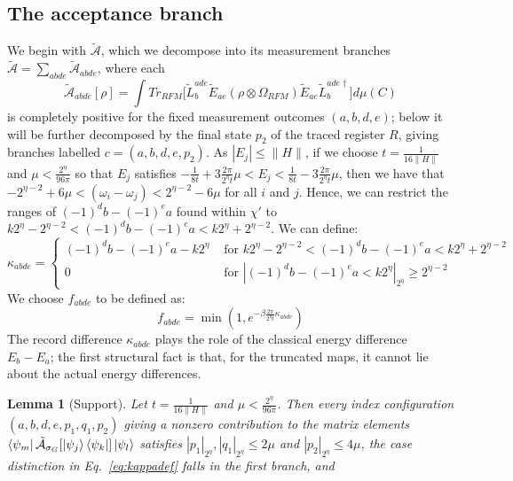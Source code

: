 \documentclass[aps,floatfix,10pt,amssymb,amsfont,amsmath,superscriptaddress,float,nofootinbib,longbibliography,nobalancelastpage,twocolumn]{revtex4-2}
\newtheorem{lemma}{Lemma}
\begin{document}
\subsection{The acceptance branch}
\label{subsec:acceptance}
\begin{widetext}
We begin with $\tilde{\mathcal{A}}$, which we decompose into its measurement branches $\tilde{\mathcal{A}} = \sum_{abde}\tilde{\mathcal{A}}_{abde}$, where each
\begin{equation}
    \tilde{\mathcal{A}}_{abde}[\rho] = \int  Tr_{RFM}\bigg[\tilde L_b^{ade} \tilde E_{ae} ( \rho\otimes \Omega_{RFM})
     \tilde E_{ae}\tilde L^{ade\dagger}_b\bigg]d\mu(C)
\end{equation}
is completely positive for the fixed measurement outcomes $(a,b,d,e)$; below it will be further decomposed by the final state $p_2$ of the traced register $R$, giving branches labelled $c = (a,b,d,e,p_2)$.
As $|E_j| \leq \|H\|$, if we choose $t = \frac{1}{16\|H\|}$ and $\mu < \frac{2^{\eta}}{96\pi}$ so that $E_j$ satisfies $-\frac{1}{8t} + 3\frac{2\pi}{2^{\eta}t}\mu < E_j < \frac{1}{8t} - 3\frac{2\pi}{2^{\eta}t}\mu$, then we have that $-2^{\eta-2}+6\mu < (\omega_{i}-\omega_{j}) < 2^{\eta-2}-6\mu$ for all $i$ and $j$. Hence, we can restrict the ranges of $(-1)^db-(-1)^ea$ found within $\chi'$ to $k2^{\eta} - 2^{\eta-2}< (-1)^db-(-1)^ea < k2^{\eta} + 2^{\eta-2}$.
We can define:
\begin{equation}\label{eq:kappadef}
    \kappa_{abde} = \begin{cases}(-1)^db-(-1)^ea-k2^{\eta}& \text{ for } k2^{\eta} - 2^{\eta-2}< (-1)^db-(-1)^ea < k2^{\eta} + 2^{\eta-2}\\
    0 & \text{ for } |(-1)^db-(-1)^ea < k2^{\eta}|_{2^{\eta}} \geq 2^{\eta-2}
    \end{cases}
\end{equation}
We choose $f_{abde}$ to be defined as:
\begin{equation}\label{eq:fdef}
    f_{abde} = \min(1,e^{-\beta\frac{2\pi}{2^{\eta}t}\kappa_{abde}})
\end{equation}
The record difference $\kappa_{abde}$ plays the role of the classical energy difference $E_b - E_a$; the first structural fact is that, for the truncated maps, it cannot lie about the actual energy differences.
\begin{lemma}[Support]
\label{lemma:support}
Let $t = \frac{1}{16\|H\|}$ and $\mu < \frac{2^{\eta}}{96\pi}$. Then every index configuration $(a,b,d,e,p_1,q_1,p_2)$ giving a nonzero contribution to the matrix elements $\bra{\psi_m}\tilde{\mathcal{A}}_{\sigma_G}[\ket{\psi_j}\bra{\psi_k}]\ket{\psi_l}$ satisfies $|p_1|_{2^{\eta}}, |q_1|_{2^{\eta}} \leq 2\mu$ and $|p_2|_{2^{\eta}} \leq 4\mu$, the case distinction in Eq.~\eqref{eq:kappadef} falls in the first branch, and

\end{lemma}
\end{widetext}
\end{document}

